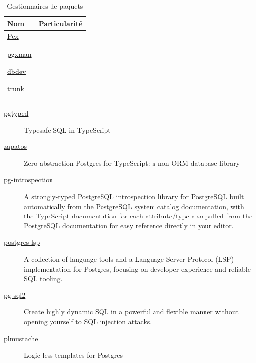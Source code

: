 \documentclass[a4paper,12pt]{article}
\begin{document}
\begin{multicols*}{2}
\begin{table}[H]
\caption{Gestionnaires de paquets}
\centering
\begin{tabular}{ll}
Nom & Particularité\\
\hline
\href{https://github.com/petere/pex}{Pex} & \\
 & \\
 & \\
\href{https://github.com/pgxman/pgxman}{pgxman} & \\
 & \\
 & \\
\href{https://github.com/supabase/dbdev}{dbdev} & \\
 & \\
 & \\
\href{https://github.com/tembo-io/trunk}{trunk} & \\
 & \\
 & \\
\end{tabular}
\end{table}

\begin{description}
\item[{\href{https://github.com/adelsz/pgtyped}{pgtyped}}] Typesafe SQL in TypeScript
\item[{\href{https://github.com/jawj/zapatos?tab=readme-ov-file}{zapatos}}] Zero-abstraction Postgres for TypeScript: a non-ORM database library
\item[{\href{https://github.com/graphile/crystal/tree/main/utils/pg-introspection}{pg-introspection}}] A strongly-typed PostgreSQL introspection library for PostgreSQL built automatically from the PostgreSQL system catalog documentation, with the TypeScript documentation for each attribute/type also pulled from the PostgreSQL documentation for easy reference directly in your editor.
\item[{\href{https://github.com/supabase-community/postgres\_lsp}{postgres-lsp}}] A collection of language tools and a Language Server Protocol (LSP) implementation for Postgres, focusing on developer experience and reliable SQL tooling.
\item[{\href{https://github.com/graphile/crystal/tree/main/utils/pg-sql2}{pg-sql2}}] Create highly dynamic SQL in a powerful and flexible manner without opening yourself to SQL injection attacks.
\item[{\href{https://github.com/PostgREST/plmustache}{plmustache}}] Logic-less templates for Postgres
\end{description}



\end{multicols*}
\end{document}
